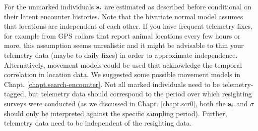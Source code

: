 For the unmarked individuals
${\bf s}_{i}$ are estimated as described before conditional on their
latent encounter histories.
Note that the bivariate normal model assumes that locations are independent of each other. If you have frequent telemetry fixes, for example from GPS collars that report animal locations every few hours or more, this assumption seems unrealistic and it might be advisable to thin your telemetry data (maybe to daily fixes) in order to approximate independence.
Alternatively, movement models could be used that acknowledge the temporal correlation in location data. We suggested some possible movement models in Chapt. \ref{chapt.search-encounter}.
Not all marked individuals need to be
telemetry-tagged, but telemetry data
should correspond to the period over which resighting surveys were conducted (as we discussed in Chapt. \ref{chapt.scr0}, both the ${\bf s}_i$ and $\sigma$ should only be interpreted against the specific sampling period). Further, telemetry data need to be independent of the resighting data.

